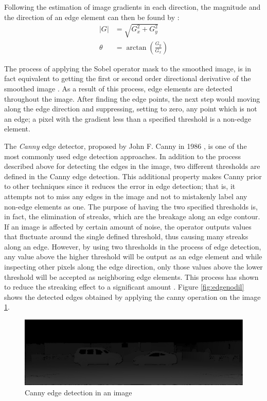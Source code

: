 Following the estimation of image gradients in each direction, the magnitude and the direction of an edge element can then be found by \cite{sze11}:
\begin{align}
\left | G \right | &= \sqrt{G_{x}^{2} + G_{y}^{2}} \\
\theta &= \arctan (\frac{G_{y}}{G_{x}})
\end{align}

The process of applying the Sobel operator mask to the smoothed image, is in fact equivalent to getting 
the first or second order directional derivative of the smoothed image \cite{sze11}. As a result of this process, edge elements are detected throughout the image.
After finding the edge points, the next step would moving along the edge direction and suppressing, setting to zero, any point which is not an edge;
a pixel with the gradient less than a specified threshold is a non-edge element.

The {\it Canny} edge detector, proposed by John F. Canny in 1986 \cite{canny86}, is one of the most commonly used edge detection approaches. In addition 
to the process described above for detecting the edges in the image, two different thresholds are defined in the Canny edge detection. This
additional property makes Canny prior to other techniques since it reduces the error in edge detection; that is, it attempts
not to miss any edges in the image and not to mistakenly label any non-edge elements as one.
The purpose of having the two specified thresholds is, in fact, the elimination of streaks, which are the breakage along an edge contour.
If an image is affected by certain amount of noise, the operator outputs values that fluctuate around the single defined threshold, thus
causing many streaks along an edge.
However, by using two thresholds in the process of edge detection, 
any value above the higher threshold will be output as an edge element and while inspecting other pixels along 
the edge direction, only those values above the lower threshold will be accepted as neighboring edge elements.
This process has shown to reduce the streaking effect to a significant amount \cite{canny86}. \newline
Figure \ref{fig:edgenodil} shows the detected edges obtained by applying the canny operation on the image \ref{fig:imggt5}.

\begin{figure}[H]
\centering
\includegraphics[scale=0.35]{imggt5}
\caption{Canny edge detection in an image}
\label{fig:imggt5}
\end{figure} 

